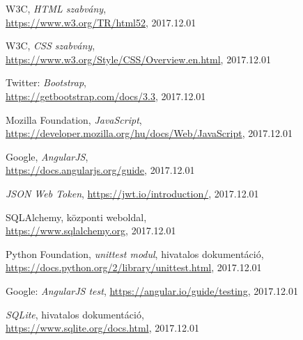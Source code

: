 \begin{thebibliography}{x}
W3C, \emph{HTML szabvány}, \\
\url{https://www.w3.org/TR/html52}, 2017.12.01


W3C, \emph{CSS szabvány}, \\
\url{https://www.w3.org/Style/CSS/Overview.en.html}, 2017.12.01

Twitter: \emph{Bootstrap}, \\
\url{https://getbootstrap.com/docs/3.3}, 2017.12.01


Mozilla Foundation, \emph{JavaScript}, \\
\url{https://developer.mozilla.org/hu/docs/Web/JavaScript}, 2017.12.01

Google, \emph{AngularJS}, \\
\url{https://docs.angularjs.org/guide}, 2017.12.01

\emph{JSON Web Token}, \url{https://jwt.io/introduction/}, 2017.12.01


SQLAlchemy, központi weboldal, \\
\url{https://www.sqlalchemy.org}, 2017.12.01


Python Foundation, \emph{unittest modul}, hivatalos dokumentáció, \\ \url{https://docs.python.org/2/library/unittest.html}, 2017.12.01


Google: \emph{AngularJS test}, \url{https://angular.io/guide/testing}, 2017.12.01


\emph{SQLite}, hivatalos dokumentáció, \\
 \url{https://www.sqlite.org/docs.html}, 2017.12.01



\end{thebibliography}
